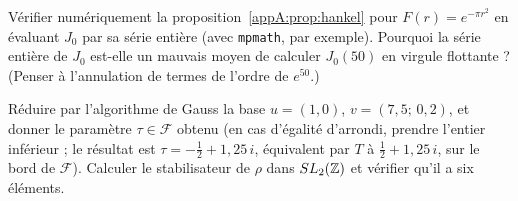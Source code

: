 \begin{exercise}
Vérifier numériquement la proposition~\ref{appA:prop:hankel} pour $F(r)=e^{-\pi r^2}$ en évaluant $J_0$ par sa série
entière (avec \texttt{mpmath}, par exemple). Pourquoi la série entière de $J_0$ est-elle un mauvais moyen de calculer
$J_0(50)$ en virgule flottante ? (Penser à l'annulation de termes de l'ordre de $e^{50}$.)
\end{exercise}

\begin{exercise}
Réduire par l'algorithme de Gauss la base $u=(1,0)$, $v=(7{,}5;\,0{,}2)$, et donner le paramètre $\tau\in\mathcal F$
obtenu (en cas d'égalité d'arrondi, prendre l'entier inférieur ; le résultat est $\tau=-\tfrac12+1{,}25\,i$, équivalent par $T$ à $\tfrac12+1{,}25\,i$, sur le bord de $\mathcal F$). Calculer le stabilisateur de $\rho$ dans $SL_2(\mathbb{Z})$ et vérifier qu'il a six éléments.
\end{exercise}
